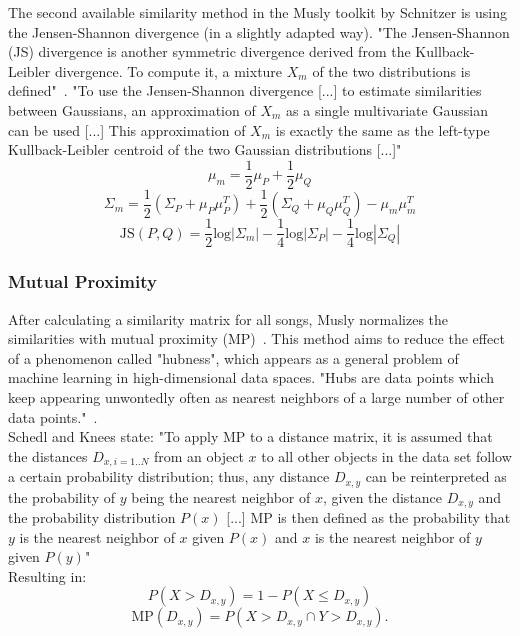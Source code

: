The second available similarity method in the Musly toolkit by Schnitzer is using the Jensen-Shannon divergence (in a slightly adapted way). "The Jensen-Shannon (JS) divergence is another symmetric divergence derived from the Kullback-Leibler divergence. To compute it, a mixture $X_m$ of the two distributions is defined"~\cite[p. 43]{schnitzer1}. "To use the Jensen-Shannon divergence [...] to estimate similarities between Gaussians, an approximation of $X_m$ as a single multivariate Gaussian can be used [...] This approximation of $X_m$ is exactly the same as the left-type Kullback-Leibler centroid of the two Gaussian distributions [...]"~\cite[p. 45]{schnitzer1} 
\begin{equation} \label{eq:jsl1}
\mu_m = \frac{1}{2} \mu_P + \frac{1}{2} \mu_Q
\end{equation}
\begin{equation} \label{eq:jsl2}
\Sigma_m = \frac{1}{2} (\Sigma_P + \mu_P\mu_P^T) + \frac{1}{2} (\Sigma_Q + \mu_Q\mu_Q^T) - \mu_m\mu_m^T
\end{equation}
\begin{equation} \label{eq:jsl3}
\text{JS}(P, Q) = \frac{1}{2} \text{log}|\Sigma_m| - \frac{1}{4} \text{log} |\Sigma_P| - \frac{1}{4} \text{log} |\Sigma_Q|
\end{equation}

\subsubsection{Mutual Proximity}\label{mprox}
After calculating a similarity matrix for all songs, Musly normalizes the similarities with mutual proximity (MP)~\cite{musly2}. This method aims to reduce the effect of a phenomenon called "hubness", which appears as a general problem of machine learning in high-dimensional data spaces. "Hubs are data points which keep appearing unwontedly often as nearest neighbors of a large number of other data points."~\cite[p. 66]{schnitzer1}.\\
Schedl and Knees state: "To apply MP to a distance matrix, it is assumed that the distances $D_{x,i = 1..N}$ from an object $x$ to all other objects in the data set follow a certain probability distribution; thus, any distance $D_{x,y}$ can be reinterpreted as the probability of $y$ being the nearest neighbor of $x$, given the distance $D_{x,y}$ and the probability distribution $P(x)$ [...] MP is then defined as the probability that $y$ is the nearest neighbor of $x$ given $P(x)$ and $x$ is the nearest neighbor of $y$ given $P(y)$"~\cite[p. 80]{knees1}\\
Resulting in: 
\begin{equation} \label{eq:mp1}
P(X > D_{x,y}) = 1 - P(X \leq D_{x,y})%
\end{equation}
\begin{equation} \label{eq:mp2}
\text{MP}(D_{x,y}) = P(X > D_{x,y} \cap Y > D_{x,y}).
\end{equation}

